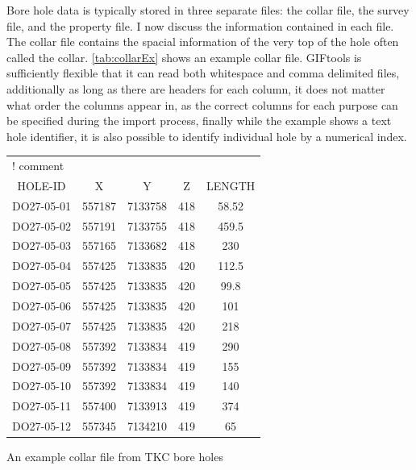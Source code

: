 Bore hole data is typically stored in three separate files: the collar file, the survey file, and the property file. I now discuss the information contained in each file. The collar file contains the spacial information of the very top of the hole often called the collar. \autoref{tab:collarEx} shows an example collar file. GIFtools is sufficiently flexible that it can read both whitespace and comma delimited files, additionally as long as there are headers for each column, it does not matter what order the columns appear in, as the correct columns for each purpose can be specified during the import process, finally while the example shows a text hole identifier, it is also possible to identify individual hole by a numerical index.
\begin{fileExample}
\begin{tabular}{|ccccc|}   
\hline
\multicolumn{5}{|l|}{! comment} \\
HOLE-ID & X & Y & Z & LENGTH \\
DO27-05-01 & 557187 & 7133758 & 418 & 58.52 \\
DO27-05-02 & 557191 & 7133755 & 418 & 459.5 \\
DO27-05-03 & 557165 & 7133682 & 418 & 230 \\
DO27-05-04 & 557425 & 7133835 & 420 & 112.5 \\
DO27-05-05 & 557425 & 7133835 & 420 & 99.8 \\
DO27-05-06 & 557425 & 7133835 & 420 & 101 \\
DO27-05-07 & 557425 & 7133835 & 420 & 218 \\
DO27-05-08 & 557392 & 7133834 & 419 & 290 \\
DO27-05-09 & 557392 & 7133834 & 419 & 155 \\
DO27-05-10 & 557392 & 7133834 & 419 & 140 \\
DO27-05-11 & 557400 & 7133913 & 419 & 374 \\
DO27-05-12 & 557345 & 7134210 & 419 & 65 \\
\hline
\end{tabular}
\caption{An example collar file from TKC bore holes}
\label{tab:collarEx}
\end{fileExample}

